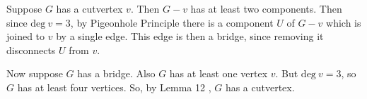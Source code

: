Suppose $G$ has a cutvertex $v$. Then $G-v$ has at least two components. 
Then since $\text{deg}\ v=3$, by Pigeonhole Principle
there is a component $U$ of $G-v$ which is joined
to $v$ by a single edge. This edge is then a bridge, since removing it
disconnects $U$ from $v$.

Now suppose $G$ has a bridge. Also $G$ has at least one vertex $v$. But 
$\text{deg}\ v=3$, so $G$ has at least four vertices. So,
by Lemma 12 \cite{notes}, $G$ has a cutvertex.
